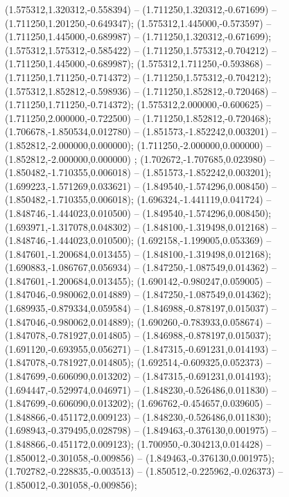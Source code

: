  (1.575312,1.320312,-0.558394) -- (1.711250,1.320312,-0.671699) -- (1.711250,1.201250,-0.649347);
 (1.575312,1.445000,-0.573597) -- (1.711250,1.445000,-0.689987) -- (1.711250,1.320312,-0.671699);
 (1.575312,1.575312,-0.585422) -- (1.711250,1.575312,-0.704212) -- (1.711250,1.445000,-0.689987);
 (1.575312,1.711250,-0.593868) -- (1.711250,1.711250,-0.714372) -- (1.711250,1.575312,-0.704212);
 (1.575312,1.852812,-0.598936) -- (1.711250,1.852812,-0.720468) -- (1.711250,1.711250,-0.714372);
 (1.575312,2.000000,-0.600625) -- (1.711250,2.000000,-0.722500) -- (1.711250,1.852812,-0.720468);
 (1.706678,-1.850534,0.012780) -- (1.851573,-1.852242,0.003201) -- (1.852812,-2.000000,0.000000);
 (1.711250,-2.000000,0.000000) -- (1.852812,-2.000000,0.000000) ;
 (1.702672,-1.707685,0.023980) -- (1.850482,-1.710355,0.006018) -- (1.851573,-1.852242,0.003201);
 (1.699223,-1.571269,0.033621) -- (1.849540,-1.574296,0.008450) -- (1.850482,-1.710355,0.006018);
 (1.696324,-1.441119,0.041724) -- (1.848746,-1.444023,0.010500) -- (1.849540,-1.574296,0.008450);
 (1.693971,-1.317078,0.048302) -- (1.848100,-1.319498,0.012168) -- (1.848746,-1.444023,0.010500);
 (1.692158,-1.199005,0.053369) -- (1.847601,-1.200684,0.013455) -- (1.848100,-1.319498,0.012168);
 (1.690883,-1.086767,0.056934) -- (1.847250,-1.087549,0.014362) -- (1.847601,-1.200684,0.013455);
 (1.690142,-0.980247,0.059005) -- (1.847046,-0.980062,0.014889) -- (1.847250,-1.087549,0.014362);
 (1.689935,-0.879334,0.059584) -- (1.846988,-0.878197,0.015037) -- (1.847046,-0.980062,0.014889);
 (1.690260,-0.783933,0.058674) -- (1.847078,-0.781927,0.014805) -- (1.846988,-0.878197,0.015037);
 (1.691120,-0.693955,0.056271) -- (1.847315,-0.691231,0.014193) -- (1.847078,-0.781927,0.014805);
 (1.692514,-0.609325,0.052373) -- (1.847699,-0.606090,0.013202) -- (1.847315,-0.691231,0.014193);
 (1.694447,-0.529974,0.046971) -- (1.848230,-0.526486,0.011830) -- (1.847699,-0.606090,0.013202);
 (1.696762,-0.454657,0.039605) -- (1.848866,-0.451172,0.009123) -- (1.848230,-0.526486,0.011830);
 (1.698943,-0.379495,0.028798) -- (1.849463,-0.376130,0.001975) -- (1.848866,-0.451172,0.009123);
 (1.700950,-0.304213,0.014428) -- (1.850012,-0.301058,-0.009856) -- (1.849463,-0.376130,0.001975);
 (1.702782,-0.228835,-0.003513) -- (1.850512,-0.225962,-0.026373) -- (1.850012,-0.301058,-0.009856);
